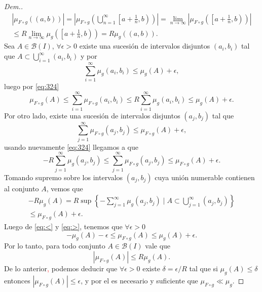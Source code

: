 \begin{proof}[Dem.]
\begin{multline}\label{eq:324}
    |\mu_{F\circ g}((a,b))|=\left|\mu_{F\circ g}\left(\bigcup_{n=1}^{\infty}\left[a+\frac{1}{n},b\right)\right)\right|=\lim_{n\to \infty}\left|\mu_{F\circ g}\left(\left[a+\frac{1}{n},b\right)\right)\right|\\
    \leq R\lim_{n\to \infty}\mu_{g}\left(\left[a+\frac{1}{n},b\right)\right)=R\mu_g((a,b)).
\end{multline}
Sea $A\in \mathcal{B}(I)$, $\forall \epsilon>0$ existe  una sucesión de intervalos disjuntos $(a_i,b_i)$ tal que $A\subset \displaystyle\bigcup_{i=1}^{\infty}(a_i,b_i)$ y  por  \cite[Lema 1.7]{folland} 
$$\sum_{i=1}^{\infty}\mu_{ g}(a_i,b_i)\leq \mu_g(A)+\epsilon,$$
luego por \eqref{eq:324}
\begin{equation}
    \mu_{F\circ g}(A)\leq \sum_{i=1}^{\infty}\mu_{F\circ g}(a_i,b_i)\leq R\sum_{i=1}^{\infty}\mu_{ g}(a_i,b_i)\leq \mu_g(A)+\epsilon.\label{eq:<}
\end{equation}
Por otro lado, existe una sucesión de intervalos disjuntos $(a_j,b_j)$ tal que 
$$\sum_{j=1}^{\infty}\mu_{F\circ g}(a_j,b_j)\leq \mu_{F\circ g}(A)+\epsilon,$$
usando nuevamente \eqref{eq:324} llegamos a que 
\begin{equation*}
-R\sum_{j=1}^{\infty}\mu_{ g}(a_j,b_j)\leq \sum_{j=1}^{\infty}\mu_{F\circ g}(a_j,b_j)\leq \mu_{F\circ g}(A)+\epsilon.
\end{equation*}
Tomando supremo sobre los intervalos $(a_j,b_j)$ cuya unión numerable contienen al conjunto $A$, vemos que
\begin{multline}
    -R\mu_g(A)=R\sup\left\{ -\sum_{j=1}^{\infty}\mu_{ g}(a_j,b_j)  \mid A\subset \bigcup_{j=1}^{\infty}(a_j,b_j) \right\}\\
    \leq \mu_{F\circ g}(A)+\epsilon.\label{eq:>}
\end{multline}
Luego de \eqref{eq:<} y \eqref{eq:>}, tenemos que $\forall \epsilon>0$
\begin{equation}
    -\mu_g(A)-\epsilon\leq \mu_{F\circ g}(A)\leq  \mu_g(A)+\epsilon.
\end{equation}
Por lo tanto, para todo conjunto $A\in \mathcal{B}(I)$ vale que 
$$ |\mu_{F\circ g}(A)|\leq R\mu_g(A).$$
De lo anterior\textcolor{red}{,} podemos deducir que $\forall \epsilon>0$ existe $\delta=\epsilon/R$ tal que si $\mu_g(A)\leq \delta$ entonces $|\mu_{F\circ g}(A)|\leq \epsilon$, y por el   \cite[Teorema 3.5]{folland} es necesario y suficiente  que $\mu_{F\circ g} \ll \mu_g$.



\end{proof}

